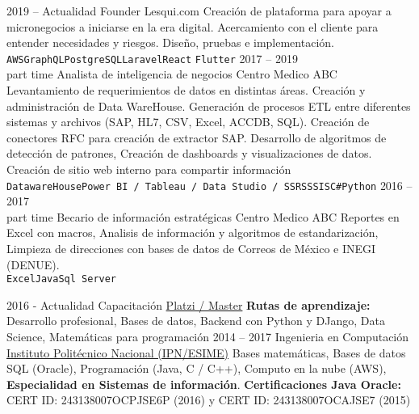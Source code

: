 \documentclass[9pt]{developercv} %
\begin{document}
\begin{entrylist}
	\entry
		{2019 -- Actualidad}
		{Founder}
		{Lesqui.com}
		{Creación de plataforma para apoyar a micronegocios a iniciarse en la era digital. Acercamiento con el cliente para entender necesidades y riesgos. Diseño, pruebas e implementación. \\ \texttt{AWS}\slashsep\texttt{GraphQL}\slashsep\texttt{PostgreSQL}\slashsep\texttt{Laravel}\slashsep\texttt{React} \slashsep\texttt{Flutter}}
	\entry
		{2017 -- 2019\\\footnotesize{part time}}
		{Analista de inteligencia de negocios}
		{Centro Medico ABC}
		{Levantamiento de requerimientos de datos en distintas áreas. Creación y administración de Data WareHouse. Generación de procesos ETL entre diferentes sistemas y archivos (SAP, HL7, CSV, Excel, ACCDB, SQL). Creación de conectores RFC para creación de extractor SAP. Desarrollo de algoritmos de detección de patrones, Creación de dashboards y visualizaciones de datos. Creación de sitio web interno para compartir información\\ 
			\texttt{DatawareHouse}\slashsep\texttt{Power BI / Tableau / Data Studio / SSRS}\slashsep\texttt{SSIS}\slashsep\texttt{C\#}\slashsep\texttt{Python}}
	\entry
		{2016 -- 2017\\\footnotesize{part time}}
		{Becario de información estratégicas}
		{Centro Medico ABC}
		{Reportes en Excel con macros, Analisis de información y algoritmos de estandarización, Limpieza de direcciones con bases de datos de Correos de México e INEGI (DENUE).\\ 
		\texttt{Excel}\slashsep\texttt{Java}\slashsep\texttt{Sql Server}}
\end{entrylist}



\begin{entrylist}
	\entry
		{2016 - Actualidad}
		{Capacitación}
		{\href{https://platzi.com/@eocode}{Platzi / Master}}
		{\textbf{Rutas de aprendizaje:} Desarrollo profesional, Bases de datos, Backend con Python y DJango, Data Science, Matemáticas para programación}	
	\entry
		{2014 -- 2017}
		{Ingenieria en Computación}
		{\href{https://www.esimecu.ipn.mx/}{Instituto Politécnico Nacional (IPN/ESIME)}}
		{Bases matemáticas, Bases de datos SQL (Oracle), Programación (Java, C / C++), Computo en la nube (AWS), \textbf{Especialidad en Sistemas de información}. \textbf{Certificaciones Java Oracle:} CERT ID: 243138007OCPJSE6P (2016) y CERT ID: 243138007OCAJSE7 (2015) }
		
\end{entrylist}
\end{document}
